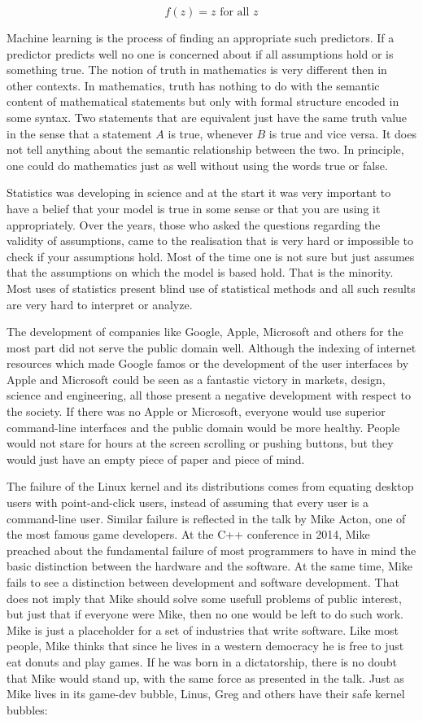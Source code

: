 \documentclass{article}
\begin{document}
\[f(z) = z \text{ for all } z\]

Machine learning is the process of finding an appropriate such predictors.
If a predictor predicts well no one is concerned about if all
assumptions hold or is something true. The notion of truth in mathematics
is very different then in other contexts. In mathematics, truth has nothing
to do with the semantic content of mathematical statements but only with
formal structure encoded in some syntax. Two statements that are equivalent
just have the same truth value in the sense that a statement \(A\) is true, 
whenever \(B\) is true and vice versa. It does not tell anything about the
semantic relationship between the two. In principle, one could do mathematics
just as well without using the words true or false. 

Statistics was developing in science and at the start it was very important to
have a belief that your model is true in some sense or that you are using it
appropriately.
Over the years, those who asked the questions regarding the validity of
assumptions, came to the realisation that is very hard or impossible to
check if your assumptions hold. Most of the time one is not sure but 
just assumes that the assumptions on which the model is based hold. That is
the minority. Most uses of statistics present blind use of statistical
methods and all such results are very hard to interpret or analyze.

The development of companies like Google, Apple, Microsoft and others for
the most part did not serve the public domain well. Although the indexing
of internet resources which made Google famos or the development of the 
user interfaces by Apple and Microsoft could be seen as a fantastic victory
in markets, design, science and engineering, all those present a negative
development with respect to the society. If there was no Apple or Microsoft,
everyone would use superior command-line interfaces and the public domain
would be more healthy. People would not stare for hours at the screen
scrolling or pushing buttons, but they would just have an empty piece of paper
and piece of mind.

The failure of the Linux kernel and its distributions comes from equating
desktop users with point-and-click users, instead of assuming that every 
user is a command-line user. Similar failure is reflected in the talk by
Mike Acton, one of the most famous game developers. At the C++ conference
in 2014, Mike preached about the fundamental failure of most programmers
to have in mind the basic distinction between the hardware and the software.
At the same time, Mike fails to see a distinction between development and
software development. That does not imply that Mike should solve some usefull
problems of public interest, but just that if everyone were Mike, then 
no one would be left to do such work. Mike is just a placeholder for a set of
industries that write software. Like most people, Mike thinks that since he
lives in a western democracy he is free to just eat donuts and play games.
If he was born in a dictatorship, there is no doubt that Mike would stand 
up, with the same force as presented in the talk. Just as Mike lives in its
game-dev bubble, Linus, Greg and others have their safe kernel bubbles: 
\end{document}
